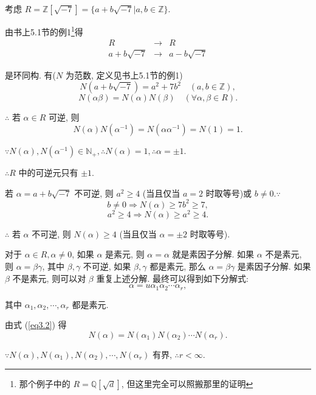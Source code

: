 \documentclass[color=black,device=normal,lang=cn,mode=geye]{elegantnote}
\begin{document}
\begin{example}\label{exp3.2}
    考虑 $R=\mathbb{Z}[\sqrt{-7}]=\{a+b\sqrt{-7}|a,b\in\mathbb{Z}\}$.

    由书上5.1节的例1\footnote{那个例子中的 $R=\mathbb{Q}[\sqrt{d}]$, 但这里完全可以照搬那里的证明}得
    \begin{equation}\label{eq3.1}
        \begin{array}{rcl}
            R & \to & R \\
            a+b\sqrt{-7} & \to & a-b\sqrt{-7}
        \end{array}
    \end{equation}

    是环同构. 有($N$ 为范数, 定义见书上5.1节的例1)
    \[N(a+b\sqrt{-7})=a^2+7b^2\quad(a,b\in\mathbb{Z}),\]
    \begin{equation}\label{eq3.2}
        N(\alpha\beta)=N(\alpha)N(\beta)\quad(\forall\alpha,\beta\in R).
    \end{equation}

    $\therefore$ 若 $\alpha\in R$ 可逆, 则
    \[N(\alpha)N(\alpha^{-1})=N(\alpha\alpha^{-1})=N(1)=1.\]

    $\because N(\alpha),N(\alpha^{-1})\in\mathbb{N}_+,\therefore N(\alpha)=1,\therefore\alpha=\pm1$.

    $\therefore R$ 中的可逆元只有 $\pm1$.

    若 $\alpha=a+b\sqrt{-7}$ 不可逆, 则 $a^2\geq4$ (当且仅当 $a=2$ 时取等号)或 $b\neq0.\because$
    \[b\neq0\Rightarrow N(\alpha)\geq7b^2\geq7,\]
    \[a^2\geq4\Rightarrow N(\alpha)\geq a^2\geq4.\]

    $\therefore$ 若 $\alpha$ 不可逆, 则 $N(\alpha)\geq4$ (当且仅当 $\alpha=\pm2$ 时取等号).

    对于 $\alpha\in R,\alpha\neq0$, 如果 $\alpha$ 是素元, 则 $\alpha=\alpha$ 就是素因子分解. 如果 $\alpha$ 不是素元, 则 $\alpha=\beta\gamma$, 其中 $\beta,\gamma$ 不可逆, 如果 $\beta,\gamma$ 都是素元, 那么 $\alpha=\beta\gamma$ 是素因子分解. 如果 $\beta$ 不是素元, 则可以对 $\beta$ 重复上述分解. 最终可以得到如下分解式:
    \begin{equation}\label{eq3.3}
        \alpha=u\alpha_1\alpha_2\cdots\alpha_r,
    \end{equation}

    其中 $\alpha_1,\alpha_2,\cdots,\alpha_r$ 都是素元.

    由式 (\ref{eq3.2}) 得
    \[N(\alpha)=N(\alpha_1)N(\alpha_2)\cdots N(\alpha_r).\]

    $\because N(\alpha),N(\alpha_1),N(\alpha_2),\cdots,N(\alpha_r)$ 有界, $\therefore r<\infty$.


\end{example}
\end{document}
